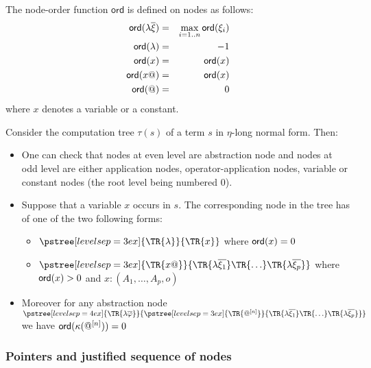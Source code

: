 \begin{dfn}
The node-order function $\textsf{ord}$ is defined on nodes as
follows:
\begin{eqnarray*}
{\sf ord}(\lambda \overline{\xi}) &=& \max_{i=1..n} {\sf ord}(\xi_i) \\
{\sf ord}(\lambda) &=& -1 \\
{\sf ord}(x) &=& {\sf ord}(x) \\
{\sf ord}(x@) &=& {\sf ord}(x) \\
{\sf ord}(@) &=& 0
\end{eqnarray*}
where $x$ denotes a variable or a constant.
\end{dfn}


Consider the computation tree $\tau(s)$ of a term $s$ in $\eta$-long normal form. Then:
\begin{itemize}
\item One can check that nodes at even level are abstraction
node and nodes at odd level are either application nodes,
operator-application nodes, variable or constant nodes (the root level being numbered $0$).

\item Suppose that a variable $x$ occurs in $s$. The corresponding node in the tree has of one of the two following forms:
    \begin{itemize}
    \item $ \pstree[levelsep=3ex]
        { \TR{\lambda } }
        { \TR{x}
        }$ where ${\sf ord}(x) = 0$

    \item $ \pstree[levelsep=3ex]
                { \TR{x @} }
                { \TR{\lambda \overline{\xi_1}} \TR{\ldots} \TR{\lambda \overline{\xi_p}}}
        $ where ${\sf ord}(x) > 0$ and $x:(A_1,\ldots,A_p,o)$
    \end{itemize}

\item    Moreover for any abstraction node
        $ \pstree[levelsep=4ex]
            { \TR{\lambda \overline{\varphi}} }
            { \pstree[levelsep=3ex]
                {\TR{@^{[n]}}}
                {\TR{\lambda \overline{\xi_1}} \TR{\ldots} \TR{\lambda \overline{\xi_p}}}
            }
        $
    we have ${\sf ord}(\kappa(@^{[n]}))=0$

\end{itemize}



\subsubsection{Pointers and justified sequence of nodes}

